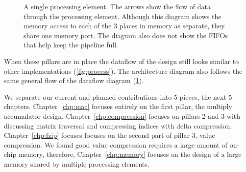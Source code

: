 \begin{figure}
\begin{tikzpicture}[scale=1]
\end{tikzpicture}
\caption[Diagram of a single processing element]{A single processing element. The arrows show the flow of data through the processing element. Although this diagram shows the memory access to each of the 3 places in memory as separate, they share one memory port. The diagram also does not show the FIFOs that help keep the pipeline full.}
\label{fig:SpMV}
\end{figure}%
%
When these pillars are in place the dataflow of the design still looks similar to other implementations (\figurename \ref{fig:process}). The architecture diagram also follows the same general flow of the dataflow diagram (\figurename \ref{fig:SpMV}).
\par We separate our current and planned contributions into 5 pieces, the next 5 chapters. Chapter~\ref{chp:mac} focuses entirely on the first pillar, the multiply accumulator design. Chapter~\ref{chp:compression} focuses on pillars 2 and 3 with discussing matrix traversal and compressing indices with delta compression. Chapter~\ref{chp:fzip} focuses focuses on the second part of pillar 3, value compression. We found good value compression requires a large amount of on-chip memory, therefore, Chapter~\ref{chp:memory} focuses on the design of a large memory shared by multiple processing elements.
